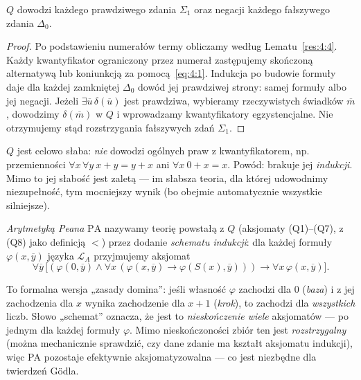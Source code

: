 \begin{lemat}\label{res:4:7}
$Q$ dowodzi każdego prawdziwego zdania $\Sigma_1$ oraz negacji każdego fałszywego zdania $\Delta_0$.
\end{lemat}
\begin{proof}
Po podstawieniu numerałów termy obliczamy według Lematu~\ref{res:4:4}. Każdy kwantyfikator ograniczony przez numerał zastępujemy skończoną alternatywą lub koniunkcją za pomocą~\eqref{eq:4:1}. Indukcja po budowie formuły daje dla każdej zamkniętej $\Delta_0$ dowód jej prawdziwej strony: samej formuły albo jej negacji. Jeżeli $\exists\overline u\,\delta(\overline u)$ jest prawdziwa, wybieramy rzeczywistych świadków $\overline m$, dowodzimy $\delta(\overline m)$ w $Q$ i wprowadzamy kwantyfikatory egzystencjalne. Nie otrzymujemy stąd rozstrzygania fałszywych zdań $\Sigma_1$.
\end{proof}

\begin{uwaga}\label{res:4:8}
$Q$ jest celowo słaba: \emph{nie} dowodzi ogólnych praw z kwantyfikatorem, np. przemienności $\forall x\,\forall y\ x+y=y+x$ ani $\forall x\ 0+x=x$. Powód: brakuje jej \emph{indukcji}. Mimo to jej słabość jest zaletą --- im słabsza teoria, dla której udowodnimy niezupełność, tym mocniejszy wynik (bo obejmie automatycznie wszystkie silniejsze).
\end{uwaga}

\begin{definicja}\label{res:4:9}
\emph{Arytmetyką Peana} $\mathrm{PA}$ nazywamy teorię powstałą z $Q$ (aksjomaty (Q1)--(Q7), z (Q8) jako definicją $<$) przez dodanie \emph{schematu indukcji}: dla każdej formuły $\varphi(x,\overline y)$ języka $\mathcal L_A$ przyjmujemy aksjomat
\[
\forall\overline y\,\bigl[(\varphi(0,\overline y)\land\forall x\,(\varphi(x,\overline y)\to\varphi(S(x),\overline y)))\to\forall x\,\varphi(x,\overline y)\bigr].
\]
\end{definicja}

\begin{uwaga}\label{res:4:10}
To formalna wersja „zasady domina”: jeśli własność $\varphi$ zachodzi dla $0$ (\emph{baza}) i z jej zachodzenia dla $x$ wynika zachodzenie dla $x+1$ (\emph{krok}), to zachodzi dla \emph{wszystkich} liczb. Słowo „schemat” oznacza, że jest to \emph{nieskończenie wiele} aksjomatów --- po jednym dla każdej formuły $\varphi$. Mimo nieskończoności zbiór ten jest \emph{rozstrzygalny} (można mechanicznie sprawdzić, czy dane zdanie ma kształt aksjomatu indukcji), więc PA pozostaje efektywnie aksjomatyzowalna --- co jest niezbędne dla twierdzeń Gödla.
\end{uwaga}

